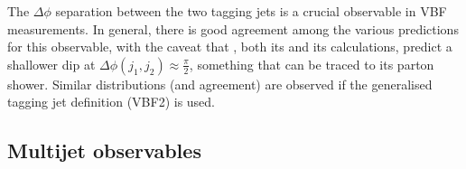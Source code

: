 The $\Delta\phi$ separation between the two tagging jets is a crucial 
observable in VBF measurements. 
In general, there is good agreement among the various predictions for
this observable, with the caveat
 that \Sherpa, both 
its \NNLOPS and its \MEPSatNLO calculations, predict a shallower dip 
at $\Delta\phi(j_1,j_2)\approx\tfrac{\pi}{2}$, something that can be 
traced to its parton shower. Similar distributions (and agreement) 
are observed if the generalised tagging jet definition (VBF2) is used.







\clearpage
\subsection{Multijet observables}
\label{sec:hjetscomp:results:mjobs}

